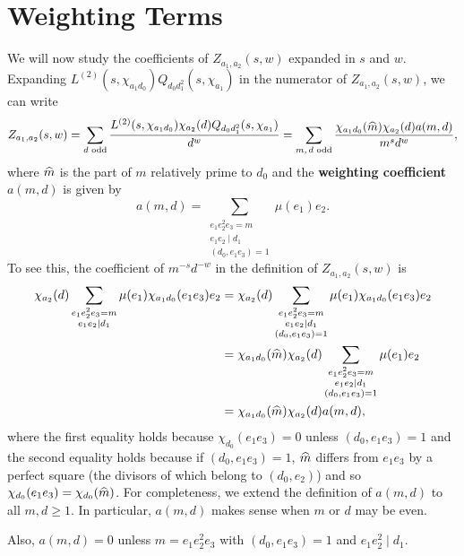 \documentclass[12pt,reqno,oneside]{amsart}
\begin{document}
\section*{Weighting Terms}
    We will now study the coefficients of $Z_{a_{1},a_{2}}(s,w)$ expanded in $s$ and $w$. Expanding $L^{(2)}(s,\chi_{a_{1}d_{0}})Q_{d_{0}d_{1}^{2}}(s,\chi_{a_{1}})$ in the numerator of $Z_{a_{1},a_{2}}(s,w)$, we can write
    \[
        Z_{a_{1},a_{2}}(s,w) = \sum_{\text{$d$ odd}}\frac{L^{(2)}(s,\chi_{a_{1}d_{0}})\chi_{a_{2}}(d)Q_{d_{0}d_{1}^{2}}(s,\chi_{a_{1}})}{d^{w}} = \sum_{\text{$m,d$ odd}}\frac{\chi_{a_{1}d_{0}}(\widehat{m})\chi_{a_{2}}(d)a(m,d)}{m^{s}d^{w}},
    \]
    where $\widehat{m}$ is the part of $m$ relatively prime to $d_{0}$ and the \textbf{weighting coefficient} $a(m,d)$ is given by
    \[
        a(m,d) = \sum_{\substack{e_{1}e_{2}^{2}e_{3} = m \\ e_{1}e_{2} \mid d_{1} \\ (d_{0},e_{1}e_{3}) = 1}}\mu(e_{1})e_{2}.
    \]
    To see this, the coefficient of $m^{-s}d^{-w}$ in the definition of $Z_{a_{1},a_{2}}(s,w)$ is
    \begin{align*}
        \chi_{a_{2}}(d)\sum_{\substack{e_{1}e_{2}^{2}e_{3} = m \\ e_{1}e_{2} \mid d_{1}}}\mu(e_{1})\chi_{a_{1}d_{0}}(e_{1}e_{3})e_{2} &= \chi_{a_{2}}(d)\sum_{\substack{e_{1}e_{2}^{2}e_{3} = m \\ e_{1}e_{2} \mid d_{1} \\ (d_{0},e_{1}e_{3}) = 1}}\mu(e_{1})\chi_{a_{1}d_{0}}(e_{1}e_{3})e_{2} \\
        &= \chi_{a_{1}d_{0}}(\widehat{m})\chi_{a_{2}}(d)\sum_{\substack{e_{1}e_{2}^{2}e_{3} = m \\ e_{1}e_{2} \mid d_{1} \\ (d_{0},e_{1}e_{3}) = 1}}\mu(e_{1})e_{2} \\
        &= \chi_{a_{1}d_{0}}(\widehat{m})\chi_{a_{2}}(d)a(m,d),
    \end{align*}
    where the first equality holds because $\chi_{d_{0}}(e_{1}e_{3}) = 0$ unless $(d_{0},e_{1}e_{3}) = 1$ and the second equality holds because if $(d_{0},e_{1}e_{3}) = 1$, $\widehat{m}$ differs from $e_{1}e_{3}$ by a perfect square (the divisors of which belong to $(d_{0},e_{2})$) and so $\chi_{d_{0}}(e_{1}e_{3}) = \chi_{d_{0}}(\widehat{m})$. For completeness, we extend the definition of $a(m,d)$ to all $m,d \ge 1$. In particular, $a(m,d)$ makes sense when $m$ or $d$ may be even.
    
    \begin{remark}\label{rem:weighting_coefficient_remark}
        Also, $a(m,d) = 0$ unless $m = e_{1}e_{2}^{2}e_{3}$ with $(d_{0},e_{1}e_{3}) = 1$ and $e_{1}e_{2}^{2} \mid d_{1}$.
    \end{remark}
\end{document}
